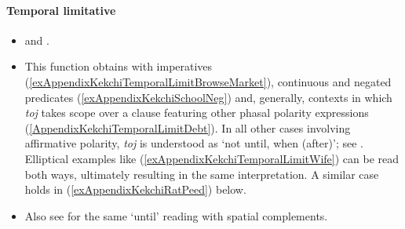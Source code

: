 \paragraph{Temporal limitative}\label{appendixKekchiUntil}
\largerpage[2]
\begin{itemize}
	\item \textcite[171]{VocabularioKechi2004} and \textcite{Kockelman2020}.
	\item This function obtains with imperatives (\ref{exAppendixKekchiTemporalLimitBrowseMarket}), continuous and negated predicates (\ref{exAppendixKekchiSchoolNeg}) and, generally, contexts in which \textit{toj} takes scope over a clause featuring other phasal polarity expressions (\ref{AppendixKekchiTemporalLimitDebt}). In all other cases involving affirmative polarity, \textit{toj} is understood as \lq not until, when (after)\rq{}; see . Elliptical examples like (\ref{exAppendixKekchiTemporalLimitWife}) can be read both ways, ultimately resulting in the same interpretation. A similar case holds in (\ref{exAppendixKekchiRatPeed}) below. 
	\item Also see  for the same \lq until\rq{ }reading with spatial complements.
\end{itemize}
